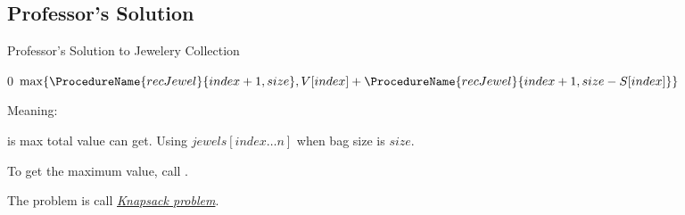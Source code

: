 
\subsection{Professor's Solution}

\begin{algorithm}[H]
    \caption{Professor's Solution to Jewelery Collection}\label{recursive_jewelery_collection_pro}
    \begin{algorithmic}
                \Return $0$
            \EndIf
                \Return {}
            \EndIf
            \Return $\max\{\ProcedureName{recJewel}{index+1, size}, V[index]+\ProcedureName{recJewel}{index+1,size-S[index]}\}$
        \EndProcedure
    \end{algorithmic}
\end{algorithm}

Meaning:

 is max total value can get.
Using $jewels[index \ldots n]$ when bag size is $size$.

To get the maximum value, call .

The problem is call \href{https://en.wikipedia.org/wiki/Knapsack_problem}{\emph{Knapsack problem}}.
